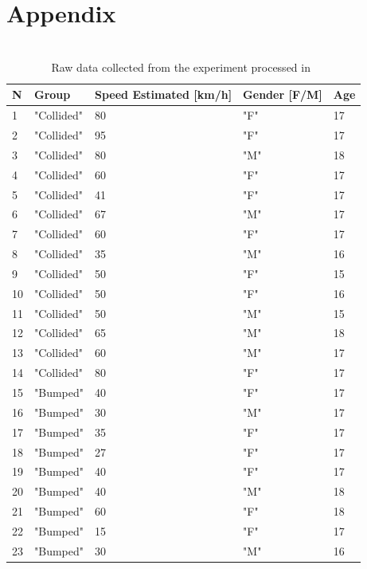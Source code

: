 \documentclass[11pt]{article}
\begin{document}
\section*{Appendix}
\begin{table}[!ht]
  \centering
  \caption{ ~\\Raw data collected from the experiment processed in~\cite{6}}
  \begin{tabular}{|l|l|l|l|l|}
  \hline
      \textbf{N} & \textbf{Group} & \textbf{Speed Estimated [km/h]} & \textbf{Gender [F/M]} & \textbf{Age} \\ \hline
      1 & "Collided" & 80 & "F" & 17 \\ \hline
      2 & "Collided" & 95 & "F" & 17 \\ \hline
      3 & "Collided" & 80 & "M" & 18 \\ \hline
      4 & "Collided" & 60 & "F" & 17 \\ \hline
      5 & "Collided" & 41 & "F" & 17 \\ \hline
      6 & "Collided" & 67 & "M" & 17 \\ \hline
      7 & "Collided" & 60 & "F" & 17 \\ \hline
      8 & "Collided" & 35 & "M" & 16 \\ \hline
      9 & "Collided" & 50 & "F" & 15 \\ \hline
      10 & "Collided" & 50 & "F" & 16 \\ \hline
      11 & "Collided" & 50 & "M" & 15 \\ \hline
      12 & "Collided" & 65 & "M" & 18 \\ \hline
      13 & "Collided" & 60 & "M" & 17 \\ \hline
      14 & "Collided" & 80 & "F" & 17 \\ \hline
      15 & "Bumped" & 40 & "F" & 17 \\ \hline
      16 & "Bumped" & 30 & "M" & 17 \\ \hline
      17 & "Bumped" & 35 & "F" & 17 \\ \hline
      18 & "Bumped" & 27 & "F" & 17 \\ \hline
      19 & "Bumped" & 40 & "F" & 17 \\ \hline
      20 & "Bumped" & 40 & "M" & 18 \\ \hline
      21 & "Bumped" & 60 & "F" & 18 \\ \hline
      22 & "Bumped" & 15 & "F" & 17 \\ \hline
      23 & "Bumped" & 30 & "M" & 16 \\ \hline

\end{tabular}
\end{table}
\end{document}
